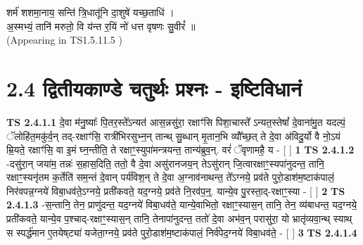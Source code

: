 \documentclass[17pt]{extarticle}
\begin{document}
शर्म॑ शशमा॒नाय॒ सन्ति॑ त्रि॒धातू॑नि दा॒शुषे॑ यच्छ॒ताधि॑ । \\अ॒स्मभ्यं॒ तानि॑ मरुतो॒ वि य॑न्त र॒यिं नो॑ धत्त वृषणः सु॒वीरं᳚ ॥\\(Appearing in TS1.5.11.5 ) \\
                \pagebreak
        
     \section*{ 2.4      द्वितीयकाण्डे चतुर्थः प्रश्नः - इष्टिविधानं }
                                        \textbf{ TS 2.4.1.1} \newline
                  दे॒वा म॑नु॒ष्याः᳚ पि॒तर॒स्ते᳚ऽन्यत॑ आस॒न्नसु॑रा॒ रक्षाꣳ॑सि पिशा॒चास्ते᳚ ऽन्यत॒स्तेषां᳚ दे॒वाना॑मु॒त यदल्पं॒ ॅलोहि॑त॒मकु॑र्व॒न् तद्-रक्षाꣳ॑सि॒ रात्री॑भिरसुभ्न॒न् तान्थ् सु॒ब्धान् मृ॒तान॒भि व्यौ᳚च्छ॒त् ते दे॒वा अ॑विदु॒र्यो वै नो॒ऽयं म्रि॒यते॒ रक्षाꣳ॑सि॒ वा इ॒मं घ्न॒न्तीति॒ ते रक्षाꣳ॒॒स्युपा॑मन्त्रयन्त॒ तान्य॑ब्रुव॒न्. वरं॑ ॅवृणामहै॒ य - [  ] \textbf{  1} \newline
                  \newline
                                \textbf{ TS 2.4.1.2} \newline
                  -दसु॑रा॒न् जया॑म॒ तन्नः॑ स॒हास॒दिति॒ ततो॒ वै दे॒वा असु॑रानजय॒न् तेऽसु॑रान् जि॒त्वारक्षाꣳ॒॒स्यपा॑नुदन्त॒ तानि॒ रक्षाꣳ॒॒स्यनृ॑तम क॒र्तेति॑ सम॒न्तं दे॒वान् पर्य॑विश॒न् ते दे॒वा अ॒ग्नाव॑नाथन्त॒ ते᳚ऽग्नये॒ प्रव॑ते पुरो॒डाश॑म॒ष्टाक॑पालं॒ निर॑वपन्न॒ग्नये॑ विबा॒धव॑ते॒ऽग्नये॒ प्रती॑कवते॒ यद॒ग्नये॒ प्रव॑ते नि॒रव॑प॒न्॒. यान्ये॒व पु॒रस्ता॒द्-रक्षाꣳ॒॒स्या - [  ] \textbf{  2} \newline
                  \newline
                                \textbf{ TS 2.4.1.3} \newline
                  -स॒न्तानि॒ तेन॒ प्राणु॑दन्त॒ यद॒ग्नये॑ विबा॒धव॑ते॒ यान्ये॒वाभितो॒ रक्षाꣳ॒॒स्यास॒न् तानि॒ तेन॒ व्य॑बाधन्त॒ यद॒ग्नये॒ प्रती॑कवते॒ यान्ये॒व प॒श्चाद्-रक्षाꣳ॒॒स्यास॒न् तानि॒ तेनापा॑नुदन्त॒ ततो॑ दे॒वा अभ॑व॒न् परासु॑रा॒ यो भ्रातृ॑व्यवा॒न्थ् स्याथ् स स्पर्द्ध॑मान ए॒तयेष्‌ट्या॑ यजेता॒ग्नये॒ प्रव॑ते पुरो॒डाश॑म॒ष्टाक॑पालं॒ निर्व॑पेद॒ग्नये॑ विबा॒धव॑ते॒ - [  ] \textbf{  3} \newline
                  \newline
                                \textbf{ TS 2.4.1.4} \newline
\end{document}
